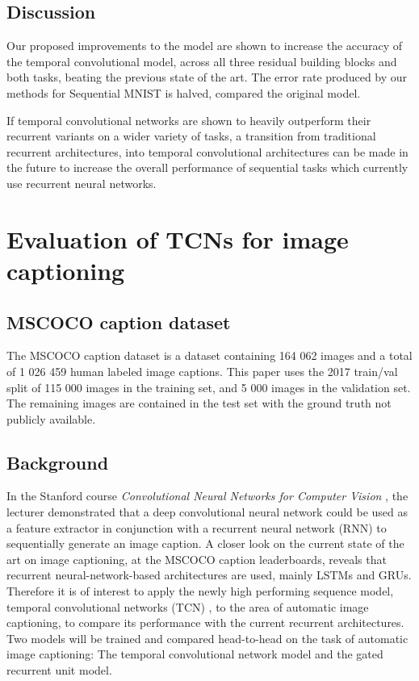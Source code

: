 \documentclass[a4paper, twoside]{article}
\begin{document}
\subsection{Discussion}
Our proposed improvements to the model are shown to increase the accuracy of the temporal convolutional model, across all three residual building blocks and both tasks, beating the previous state of the art. The error rate produced by our methods for Sequential MNIST is halved, compared the original model.

If temporal convolutional networks are shown to heavily outperform their recurrent variants on a wider variety of tasks, a transition from traditional recurrent architectures, into temporal convolutional architectures can be made in the future to increase the overall performance of sequential tasks which currently use recurrent neural networks.

\section{Evaluation of TCNs for image captioning}
\subsection{MSCOCO caption dataset}
The MSCOCO caption dataset \cite{mscoco} is a dataset containing 164 062 images and a total of 1 026 459 human labeled image captions. This paper uses the 2017 train/val split of 115 000 images in the training set, and 5 000 images in the validation set. The remaining images are contained in the test set with the ground truth not publicly available.

\subsection{Background}
In the Stanford course \textit{Convolutional Neural Networks for Computer Vision} \cite{cs231n}, the lecturer demonstrated that a deep convolutional neural network could be used as a feature extractor in conjunction with a recurrent neural network (RNN) to sequentially generate an image caption. A closer look on the current state of the art on image captioning, at the MSCOCO caption leaderboards, reveals that recurrent neural-network-based architectures are used, mainly LSTMs and GRUs. Therefore it is of interest to apply the newly high performing sequence model, temporal convolutional networks (TCN) \cite{tcn}, to the area of automatic image captioning, to compare its performance with the current recurrent architectures. Two models will be trained and compared head-to-head on the task of automatic image captioning: The temporal convolutional network model and the gated recurrent unit model.
\end{document}
